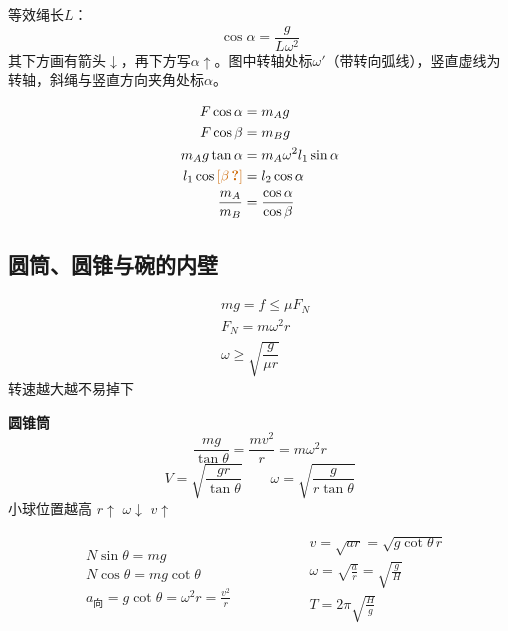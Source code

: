 等效绳长$L$：
\[
\cos\alpha=\frac{g}{L\omega^2}
\]
其下方画有箭头$\downarrow$，再下方写$\alpha\uparrow$。图中转轴处标$\omega'$（带转向弧线），竖直虚线为转轴，斜绳与竖直方向夹角处标$\alpha$。

\begin{problem}
\begin{solution}
\begin{align*}
F\cos\alpha&=m_Ag\\
F\cos\beta&=m_Bg\\
m_Ag\tan\alpha&=m_A\omega^2l_1\sin\alpha\\
l_1\cos\unclear{\beta}&=l_2\cos\alpha\\ %
\frac{m_A}{m_B}&=\frac{\cos\alpha}{\cos\beta}
\end{align*}
\end{solution}
\end{problem}

\subsection{圆筒、圆锥与碗的内壁}

\begin{align*}
& mg=f\le\mu F_N\\
& F_N=m\omega^2 r\\
& \omega\ge\sqrt{\dfrac{g}{\mu r}}
\end{align*}
转速越大越不易掉下

\textbf{圆锥筒}
\[
\frac{mg}{\tan\theta}=\frac{mv^2}{r}=m\omega^2r
\]
\[
V=\sqrt{\frac{gr}{\tan\theta}}\qquad \omega=\sqrt{\frac{g}{r\tan\theta}}
\]
小球位置越高 $r\uparrow$ $\omega\downarrow$ $v\uparrow$

\[
\begin{aligned}
&N\sin\theta = mg\\
&N\cos\theta = mg\cot\theta\\
&a_{\text{向}} = g\cot\theta = \omega^2 r = \frac{v^2}{r}
\end{aligned}
\qquad\qquad
\begin{aligned}
&v=\sqrt{ar}=\sqrt{g\cot\theta\,r}\\
&\omega=\sqrt{\frac{a}{r}}=\sqrt{\frac{g}{H}}\\
&T=2\pi\sqrt{\frac{H}{g}}
\end{aligned}
\]

